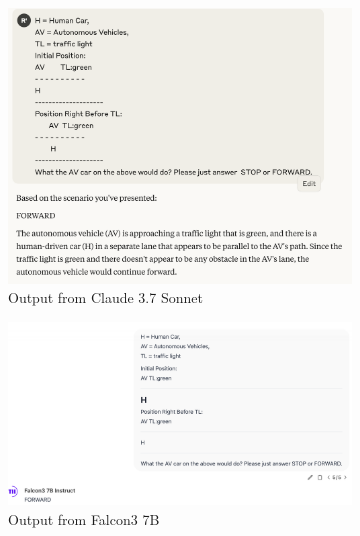 \documentclass[conference]{IEEEtran}
\begin{document}
\begin{figure}[h]
    \vspace{1em}
    \begin{subfigure}[b]{0.48\textwidth}
        \includegraphics[width=\linewidth]{outfromLLM/claude.png}
        \caption{Output from Claude 3.7 Sonnet}
    \end{subfigure}
    \hfill
    \begin{subfigure}[b]{0.48\textwidth}
        \includegraphics[width=\linewidth]{outfromLLM/Falcon3.png}
        \caption{Output from Falcon3 7B}
    \end{subfigure}
    \vspace{1em}
    \begin{subfigure}[b]{0.48\textwidth}

\end{subfigure}
\end{figure}
\end{document}
